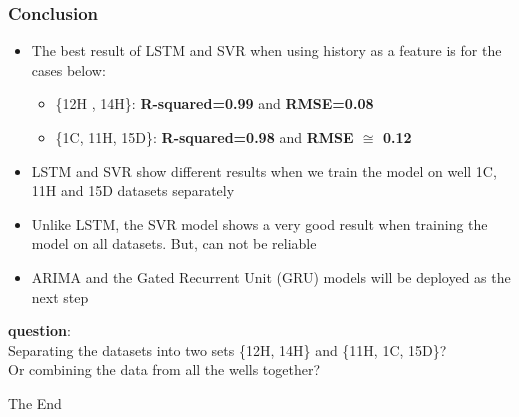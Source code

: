 \documentclass[xcolor=table]{beamer}
\begin{document}
\begin{frame}
\frametitle{Conclusion}
\begin{itemize}
\item The best result of LSTM and SVR when using history as a feature is for the cases below:
\begin{itemize}
\item \{12H , 14H\}: \textbf{R-squared=0.99} and \textbf{RMSE=0.08}
\item \{1C, 11H, 15D\}: \textbf{R-squared=0.98} and \textbf{RMSE $\cong$ 0.12} 
\end{itemize}
\item LSTM and SVR show different results when we train the model on well 1C, 11H and 15D datasets separately 
\item Unlike LSTM, the SVR model shows a very good result when training the model on all datasets. But, can not be reliable 
\item ARIMA and the Gated Recurrent Unit (GRU) models will be deployed as the next step
\end{itemize}

\textbf{question}:\\
Separating the datasets into two sets \{12H, 14H\} and \{11H, 1C, 15D\}? \\Or combining the data from all the wells together? 
\end{frame}



\begin{frame}
\Huge{\centerline{The End}}
\end{frame}

\end{document}
